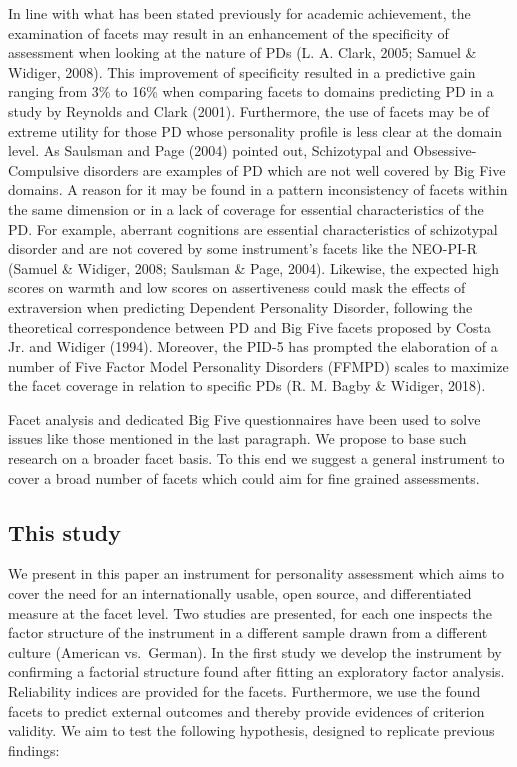 \documentclass[,man,floatsintext]{apa6}
\begin{document}
In line with what has been stated previously for academic achievement,
the examination of facets may result in an enhancement of the
specificity of assessment when looking at the nature of PDs (L. A.
Clark, 2005; Samuel \& Widiger, 2008). This improvement of specificity
resulted in a predictive gain ranging from 3\% to 16\% when comparing
facets to domains predicting PD in a study by Reynolds and Clark (2001).
Furthermore, the use of facets may be of extreme utility for those PD
whose personality profile is less clear at the domain level. As Saulsman
and Page (2004) pointed out, Schizotypal and Obsessive-Compulsive
disorders are examples of PD which are not well covered by Big Five
domains. A reason for it may be found in a pattern inconsistency of
facets within the same dimension or in a lack of coverage for essential
characteristics of the PD. For example, aberrant cognitions are
essential characteristics of schizotypal disorder and are not covered by
some instrument's facets like the NEO-PI-R (Samuel \& Widiger, 2008;
Saulsman \& Page, 2004). Likewise, the expected high scores on warmth
and low scores on assertiveness could mask the effects of extraversion
when predicting Dependent Personality Disorder, following the
theoretical correspondence between PD and Big Five facets proposed by
Costa Jr. and Widiger (1994). Moreover, the PID-5 has prompted the
elaboration of a number of Five Factor Model Personality Disorders
(FFMPD) scales to maximize the facet coverage in relation to specific
PDs (R. M. Bagby \& Widiger, 2018).

Facet analysis and dedicated Big Five questionnaires have been used to
solve issues like those mentioned in the last paragraph. We propose to
base such research on a broader facet basis. To this end we suggest a
general instrument to cover a broad number of facets which could aim for
fine grained assessments.

\subsection{This study}\label{this-study}

We present in this paper an instrument for personality assessment which
aims to cover the need for an internationally usable, open source, and
differentiated measure at the facet level. Two studies are presented,
for each one inspects the factor structure of the instrument in a
different sample drawn from a different culture (American vs.~German).
In the first study we develop the instrument by confirming a factorial
structure found after fitting an exploratory factor analysis.
Reliability indices are provided for the facets. Furthermore, we use the
found facets to predict external outcomes and thereby provide evidences
of criterion validity. We aim to test the following hypothesis, designed
to replicate previous findings:
\end{document}
